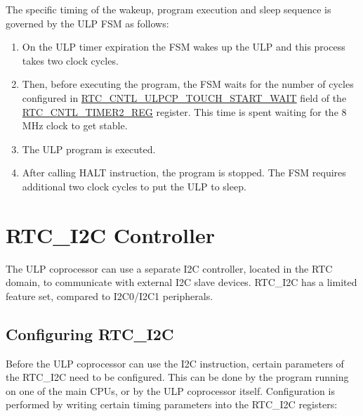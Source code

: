 \documentclass[main\_\_EN.tex]{subfiles}
\begin{document}
The specific timing of the wakeup, program execution and sleep sequence is governed by the ULP FSM as follows:
\begin{enumerate}
    \item On the ULP timer expiration the FSM wakes up the ULP and this process takes two clock cycles.
\item Then, before executing the program, the FSM waits for the number of cycles configured in \hyperref[RTCCNTLULPCPTOUCHSTARTWAIT]{RTC\_CNTL\_ULPCP\_TOUCH\_START\_WAIT} field of the \hyperref[regdesc:RTCCNTLTIMER2REG]{RTC\_CNTL\_TIMER2\_REG} register. This time is spent waiting for the 8 MHz clock to get stable.
\item The ULP program is executed.
\item After calling HALT instruction, the program is stopped. The FSM requires additional two clock cycles to put the ULP to sleep.
\end{enumerate}
\section{RTC\_I2C Controller} \label{subsection:RTC_I2C-Controller}

The ULP coprocessor can use a separate I2C controller, located in the RTC domain, to communicate with external I2C slave devices. RTC\_I2C has a limited feature set, compared to I2C0/I2C1 peripherals.


\subsection{Configuring RTC\_I2C}

Before the ULP coprocessor can use the I2C instruction, certain parameters of the RTC\_I2C need to be configured. This can be done by the program running on one of the main CPUs, or by the ULP coprocessor itself. Configuration is performed by writing certain timing parameters into the RTC\_I2C registers:
\end{document}
